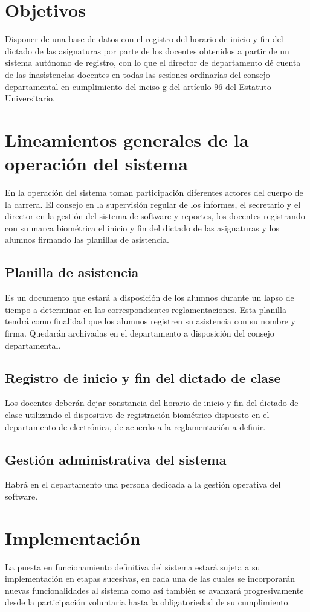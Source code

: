 \documentclass[a4paper, 11pt]{article} %
\begin{document}
\section*{Objetivos}
Disponer de una base de datos con el registro del horario de inicio y fin del dictado de las asignaturas por parte de los docentes obtenidos a partir de un sistema autónomo de registro, con lo que el director de departamento dé cuenta de las inasistencias docentes en todas las sesiones ordinarias del consejo departamental en cumplimiento del inciso g del artículo 96 del Estatuto Universitario. 
\section*{Lineamientos generales de la operación del sistema}
En la operación del sistema toman participación diferentes actores del cuerpo de la carrera. El consejo en la supervisión regular de los informes, el secretario y el director en la gestión del sistema de software y reportes, los docentes registrando con su marca biométrica el inicio y fin del dictado de las asignaturas y los alumnos firmando las planillas de asistencia.
\subsection*{Planilla de asistencia}
Es un documento que estará a disposición de los alumnos durante un lapso de tiempo a determinar en las correspondientes reglamentaciones. Esta planilla tendrá como finalidad que los alumnos registren su asistencia con su nombre y firma. Quedarán archivadas en el departamento a disposición del consejo departamental.
\subsection*{Registro de inicio y fin del dictado de clase}
Los docentes deberán dejar constancia del horario de inicio y fin del dictado de clase utilizando el dispositivo de registración biométrico dispuesto en el departamento de electrónica, de acuerdo a la reglamentación a definir.\\
\subsection*{Gestión administrativa del sistema}
Habrá en el departamento una persona dedicada a la gestión operativa del software.
\section*{Implementación}
La puesta en funcionamiento definitiva del sistema estará sujeta a su implementación en etapas sucesivas, en cada una de las cuales se incorporarán nuevas funcionalidades al sistema como así también se avanzará progresivamente desde la participación voluntaria hasta la obligatoriedad de su cumplimiento.\\
\end{document}
